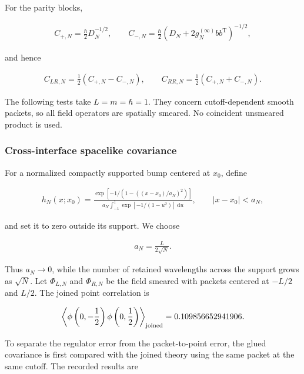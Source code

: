 For the parity blocks,

\begin{align}
C_{+,N}=\frac\hbar2D_N^{-1/2},
\qquad
C_{-,N}=\frac\hbar2
\left(D_N+2g_N^{(\infty)}bb^{\mathrm T}\right)^{-1/2},
\end{align}

and hence

\begin{align}
C_{LR,N}=\frac12(C_{+,N}-C_{-,N}),
\qquad
C_{RR,N}=\frac12(C_{+,N}+C_{-,N}).
\end{align}

The following tests take $L=m=\hbar=1$. They concern cutoff-dependent smooth packets, so all field operators are spatially smeared. No coincident unsmeared product is used.

\subsubsection{Cross-interface spacelike covariance}\label{subsubsec:cross-interface}

For a normalized compactly supported bump centered at $x_0$, define

\begin{align}
h_N(x;x_0)
=\frac{
\exp\left[-1/(1-((x-x_0)/a_N)^2)\right]
}{
a_N\int_{-1}^{1}\exp[-1/(1-u^2)]\,\mathrm du
},
\qquad
|x-x_0|<a_N,
\end{align}

and set it to zero outside its support. We choose

\begin{align}
a_N=\frac{L}{2\sqrt N}.
\end{align}

Thus $a_N\to0$, while the number of retained wavelengths across the support grows as $\sqrt N$. Let $\Phi_{L,N}$ and $\Phi_{R,N}$ be the field smeared with packets centered at $-L/2$ and $L/2$. The joined point correlation is

\begin{align}
\left\langle
\phi\left(0,-\frac12\right)
\phi\left(0,\frac12\right)
\right\rangle_{\rm joined}
=0.109856652941906.
\end{align}

To separate the regulator error from the packet-to-point error, the glued covariance is first compared with the joined theory using the same packet at the same cutoff. The recorded results are

